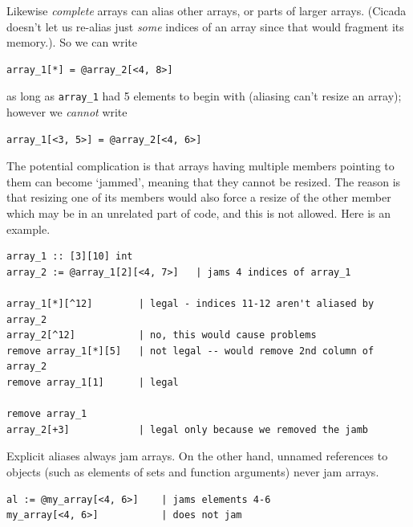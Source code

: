 \documentclass{article}
\newenvironment{code}{
       \begin{list}{}{
               \setlength{\leftmargin}{.4in}
               \setlength{\rightmargin}{0in}
               \setlength{\topsep}{.2in}
       }
       \small
       \item[] }
       { \end{list}   }
\begin{document}
\noindent Likewise \emph{complete} arrays can alias other arrays, or parts of larger arrays.  (Cicada doesn't let us re-alias just \emph{some} indices of an array since that would fragment its memory.).  So we can write

\begin{code} \begin{verbatim}
array_1[*] = @array_2[<4, 8>]
\end{verbatim} \end{code}

\noindent as long as \verb#array_1# had 5 elements to begin with (aliasing can't resize an array); however we \emph{cannot} write

\begin{code} \begin{verbatim}
array_1[<3, 5>] = @array_2[<4, 6>]
\end{verbatim} \end{code}

The potential complication is that arrays having multiple members pointing to them can become `jammed', meaning that they cannot be resized.  The reason is that resizing one of its members would also force a resize of the other member which may be in an unrelated part of code, and this is not allowed.  Here is an example.

\begin{code} \begin{verbatim}
array_1 :: [3][10] int
array_2 := @array_1[2][<4, 7>]   | jams 4 indices of array_1

array_1[*][^12]        | legal - indices 11-12 aren't aliased by array_2
array_2[^12]           | no, this would cause problems
remove array_1[*][5]   | not legal -- would remove 2nd column of array_2
remove array_1[1]      | legal

remove array_1
array_2[+3]            | legal only because we removed the jamb
\end{verbatim} \end{code}

Explicit aliases always jam arrays.  On the other hand, unnamed references to objects (such as elements of sets and function arguments) never jam arrays.

\begin{code} \begin{verbatim}
al := @my_array[<4, 6>]    | jams elements 4-6
my_array[<4, 6>]           | does not jam
\end{verbatim} \end{code}
\end{document}
